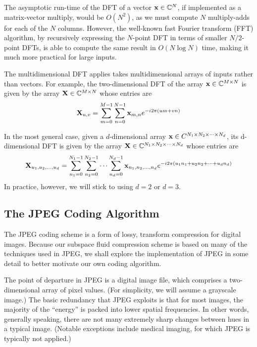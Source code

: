 The asymptotic run-time of the DFT of a vector $\mathbf{x} \in \mathbb{C}^N$, if implemented as a matrix-vector multiply, would be $O(N^2)$, as we must compute $N$ multiply-adds for each of the $N$ columns. However, the well-known fast Fourier transform (FFT) algorithm, by recursively expressing the $N$-point DFT in terms of smaller $N/2$-point DFTs, is able to compute the same result in $O(N \log{N})$ time, making it much more practical for large inputs.~\cite{1965-cooley}

The multidimensional DFT applies takes multidimensional arrays of inputs rather than vectors. For example, the two-dimensional DFT of the array $\mathbf{x} \in \mathbb{C}^{M \times N}$ is given by
the array $\mathbf{X} \in \mathbb{C}^{M \times N}$ whose entries are
\begin{equation}
	\mathbf{X}_{u,v} = \sum_{m=0}^{M-1} \sum_{n=0}^{N-1} \mathbf{x}_{m, n} e^{-i 2 \pi \left(um + vn\right)}
\end{equation}

In the most general case, given a $d$-dimensional array $\mathbf{x} \in C^{N_1 \times N_2 \times \cdots \times N_d}$, its d-dimensional DFT is given by the array $\mathbf{X} \in \mathbb{C}^{N_1 \times N_2 \times \cdots \times N_d}$ whose entries are
\begin{equation}
	\mathbf{X}_{u_1, u_2, \dots, u_d} = \sum_{n_1=0}^{N_1-1} \sum_{n_2=0}^{N_2-1} \cdots \sum_{n_d = 0}^{N_d -1} \mathbf{x}_{n_1, n_2, \dots, n_d} e^{-i 2 \pi \left(u_1 n_1 + u_2 n_2 + \cdots + u_d n_d\right)}
\end{equation}
In practice, however, we will stick to using $d=2$ or $d=3$.
\subsection{The JPEG Coding Algorithm} \label{sec:jpeg}
The JPEG coding scheme is a form of lossy, transform compression for digital images. Because our subspace fluid compression scheme is based on many of the techniques used in JPEG, we shall explore the implementation of JPEG in some detail to better motivate our own coding algorithm. 

The point of departure in JPEG is a digital image file, which comprises a two-dimensional array of pixel values. (For simplicity, we will assume a grayscale image.) The basic redundancy that JPEG exploits is that for most images, the majority of the ``energy'' is packed into lower spatial frequencies. In other words, generally speaking, there are not many extremely sharp changes between hues in a typical image. (Notable exceptions include medical imaging, for which JPEG is typically not applied.) 

